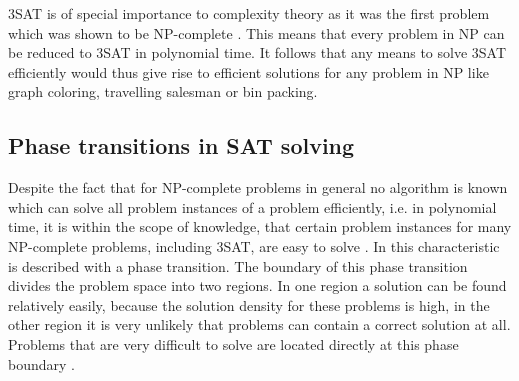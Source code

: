 3SAT is of special importance to complexity theory as it was the first problem which was shown to be NP-complete \cite{cook1971complexity}. This means that every problem in NP can be reduced to 3SAT in polynomial time. It follows that any means to solve 3SAT efficiently would thus give rise to efficient solutions for any problem in NP like graph coloring, travelling salesman or bin packing.

%
%
%

\subsection{Phase transitions in SAT solving}
Despite the fact that for NP-complete problems in general no algorithm is known which can solve all problem instances of a problem efficiently, i.e. in polynomial time, it is within the scope of knowledge, that certain problem instances for many NP-complete problems, including 3SAT, are easy to solve \cite{cheeseman1991really}. In \cite{monasson1999determining} this characteristic is described with a phase transition. The boundary of this phase transition divides the problem space into two regions. In one region a solution can be found relatively easily, because the solution density for these problems is high, in the other region it is very unlikely that problems can contain a correct solution at all. Problems that are very difficult to solve are located directly at this phase boundary \cite{cheeseman1991really}. 

